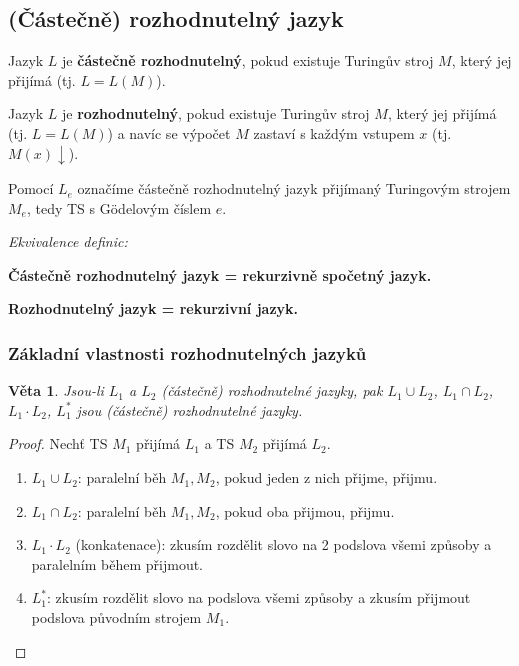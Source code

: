 \documentclass[11pt]{report} %
\newtheorem{theorem}{Věta}[section]
\numberwithin{equation}{section}
\begin{document}
\subsection{(Částečně) rozhodnutelný jazyk}
Jazyk $L$ je \textbf{částečně rozhodnutelný}, pokud existuje Turingův stroj $M$, který jej přijímá (tj. $L = L(M)$).

Jazyk $L$ je \textbf{rozhodnutelný}, pokud existuje Turingův stroj $M$, který jej přijímá (tj. $L = L(M)$) a navíc se výpočet $M$ zastaví s každým vstupem $x$ (tj. $M(x){\downarrow}$).

Pomocí $L_e$ označíme částečně rozhodnutelný jazyk přijímaný Turingovým strojem $M_e$, tedy TS s Gödelovým číslem $e$. 

\medskip
\noindent \textit{Ekvivalence definic:}

\textbf{Částečně rozhodnutelný jazyk = rekurzivně spočetný jazyk.}

\textbf{Rozhodnutelný jazyk = rekurzivní jazyk.}

\subsubsection{Základní vlastnosti rozhodnutelných jazyků}
\begin{theorem}
Jsou-li $L_1$ a $L_2$ (částečně) rozhodnutelné jazyky, pak $L_1 \cup L_2$, 	$L_1 \cap L_2$, $L_1 \cdot L_2$, $L_1^*$ jsou (částečně) rozhodnutelné jazyky.
\end{theorem}
\begin{proof} Nechť TS $M_1$ přijímá $L_1$ a TS $M_2$ přijímá $L_2$.
\begin{enumerate}
	
	
	\item $L_1 \cup L_2$: paralelní běh $M_1, M_2$, pokud jeden z nich přijme, přijmu.
	\item $L_1 \cap L_2$: paralelní běh $M_1, M_2$, pokud oba přijmou, přijmu.
	\item $L_1 \cdot L_2$ (konkatenace): zkusím rozdělit slovo na 2 podslova všemi způsoby a paralelním během přijmout.
	\item $L_1^*$: zkusím rozdělit slovo na podslova všemi způsoby a zkusím přijmout podslova původním strojem $M_1$.
\end{enumerate}
\end{proof}
\end{document}
